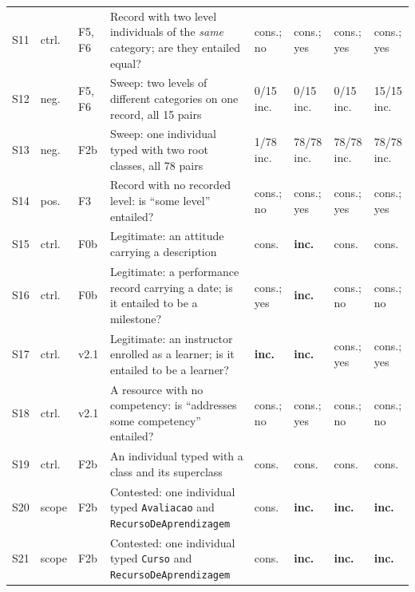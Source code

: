 \begin{table}[!t]
\begin{tabular}{ll>{\raggedright\arraybackslash}p{0.9cm}>{\raggedright\arraybackslash}p{7.3cm}llll}
S11 & ctrl. & F5, F6 & Record with two level individuals of the \emph{same} category; are they entailed equal? & cons.; no & cons.; yes & cons.; yes & cons.; yes \\
S12 & neg. & F5, F6 & Sweep: two levels of different categories on one record, all 15 pairs & 0/15 inc. & 0/15 inc. & 0/15 inc. & 15/15 inc. \\
S13 & neg. & F2b & Sweep: one individual typed with two root classes, all 78 pairs & 1/78 inc. & 78/78 inc. & 78/78 inc. & 78/78 inc. \\
S14 & pos. & F3 & Record with no recorded level: is ``some level'' entailed? & cons.; no & cons.; yes & cons.; yes & cons.; yes \\
S15 & ctrl. & F0b & Legitimate: an attitude carrying a description & cons. & \textbf{inc.} & cons. & cons. \\
S16 & ctrl. & F0b & Legitimate: a performance record carrying a date; is it entailed to be a milestone? & cons.; yes & \textbf{inc.} & cons.; no & cons.; no \\
S17 & ctrl. & v2.1 & Legitimate: an instructor enrolled as a learner; is it entailed to be a learner? & \textbf{inc.} & \textbf{inc.} & cons.; yes & cons.; yes \\
S18 & ctrl. & v2.1 & A resource with no competency: is ``addresses some competency'' entailed? & cons.; no & cons.; yes & cons.; no & cons.; no \\
S19 & ctrl. & F2b & An individual typed with a class and its superclass & cons. & cons. & cons. & cons. \\
S20 & scope & F2b & Contested: one individual typed \texttt{Avaliacao} and \texttt{RecursoDeAprendizagem} & cons. & \textbf{inc.} & \textbf{inc.} & \textbf{inc.} \\
S21 & scope & F2b & Contested: one individual typed \texttt{Curso} and \texttt{RecursoDeAprendizagem} & cons. & \textbf{inc.} & \textbf{inc.} & \textbf{inc.} \\
\hline
\end{tabular}
\end{table}

